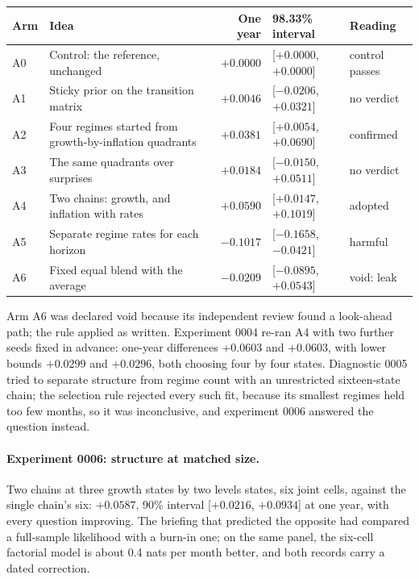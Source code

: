 \documentclass[11pt]{article}
\begin{document}
\begin{center}
\small
\begin{tabularx}{\linewidth}{@{}lXrll@{}}
\toprule
Arm & Idea & One year & 98.33\% interval & Reading \\
\midrule
A0 & Control: the reference, unchanged & $+0.0000$ & [$+0.0000$, $+0.0000$] & control passes \\
A1 & Sticky prior on the transition matrix & $+0.0046$ & [$-0.0206$, $+0.0321$] & no verdict \\
A2 & Four regimes started from growth-by-inflation quadrants & $+0.0381$ & [$+0.0054$, $+0.0690$] & confirmed \\
A3 & The same quadrants over surprises & $+0.0184$ & [$-0.0150$, $+0.0511$] & no verdict \\
A4 & Two chains: growth, and inflation with rates & $+0.0590$ & [$+0.0147$, $+0.1019$] & adopted \\
A5 & Separate regime rates for each horizon & $-0.1017$ & [$-0.1658$, $-0.0421$] & harmful \\
A6 & Fixed equal blend with the average & $-0.0209$ & [$-0.0895$, $+0.0543$] & void: leak \\
\bottomrule
\end{tabularx}
\end{center}

\noindent Arm A6 was declared void because its independent review found a look-ahead path; the rule
applied as written. Experiment 0004 re-ran A4 with two further seeds fixed in advance: one-year
differences $+0.0603$ and $+0.0603$, with lower bounds $+0.0299$ and $+0.0296$, both choosing four by
four states. Diagnostic 0005 tried to separate structure from regime count with an unrestricted
sixteen-state chain; the selection rule rejected every such fit, because its smallest regimes held too
few months, so it was inconclusive, and experiment 0006 answered the question instead.

\paragraph{Experiment 0006: structure at matched size.} Two chains at three growth states by two levels
states, six joint cells, against the single chain's six: $+0.0587$, 90\% interval [$+0.0216$,
$+0.0934$] at one year, with every question improving. The briefing that predicted the opposite had
compared a full-sample likelihood with a burn-in one; on the same panel, the six-cell factorial model is
about 0.4 nats per month better, and both records carry a dated correction.
\end{document}
